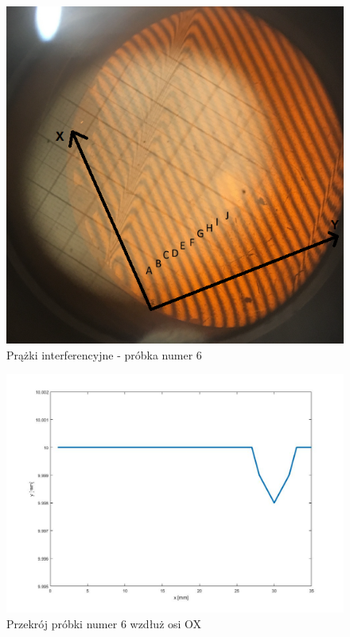 \documentclass[12pt, a4paper, oneside]{article}
\begin{document}
\clearpage
\begin{figure}[t]
\centering
\caption{Prążki interferencyjne - próbka numer 6}
\includegraphics[scale=.6]{pics/f7.png}
\end{figure}
\begin{figure}[b]
\centering
\caption{Przekrój próbki numer 6 wzdłuż osi OX}
\includegraphics[scale=.4]{pics/w3.jpg}
\end{figure}
\clearpage
\end{document}
